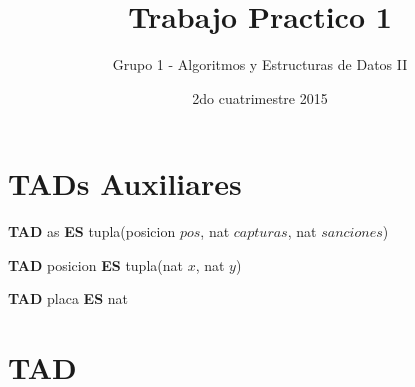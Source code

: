 \documentclass[10pt, a4paper]{article}
\author{Grupo 1 - Algoritmos y Estructuras de Datos II}
\date{2do cuatrimestre 2015}
\title{Trabajo Practico 1}
\begin{document}


\thispagestyle{empty}

\maketitle
\tableofcontents

\newpage

\section{TADs Auxiliares}
\par \textbf{TAD} as \textbf{ES} tupla(posicion $pos$, nat $capturas$, nat $sanciones$)
\par \textbf{TAD} posicion \textbf{ES} tupla(nat $x$, nat $y$)
\par \textbf{TAD} placa \textbf{ES} nat

\section{TAD }
\end{document}
